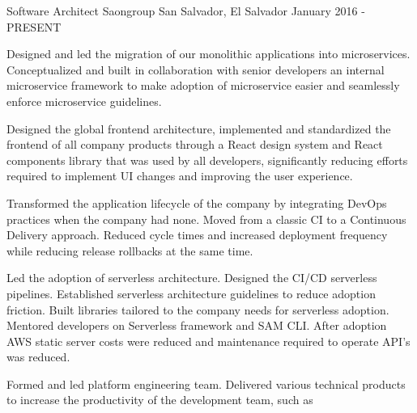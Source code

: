 

\begin{cventries}

  \cventry
    {Software Architect} %
    {Saongroup} %
    {San Salvador, El Salvador} %
    {January 2016 - PRESENT} %
    {
      \begin{cvitems} %
        \item {
          Designed and led the migration of our monolithic applications into microservices. Conceptualized and built in collaboration with senior developers an internal microservice framework to make adoption of microservice easier and seamlessly enforce microservice guidelines.
        }
        \item {
          Designed the global frontend architecture, implemented and standardized
          the frontend of all company products through a React design system and React
          components library that was used by all developers, significantly reducing efforts
          required to implement UI changes and improving the user experience.
        }
        \item {
          Transformed the application lifecycle of the company by integrating
          DevOps practices when the company had none. Moved from a classic CI to
          a Continuous Delivery approach. Reduced cycle times and increased
          deployment frequency while reducing release rollbacks at the same time.
        }
        \item {
          Led the adoption of serverless architecture. Designed the CI/CD serverless pipelines. Established serverless architecture guidelines to reduce adoption friction. Built libraries tailored to the company needs for serverless adoption. Mentored developers on Serverless framework and SAM CLI. After adoption AWS static server costs were reduced and maintenance required to operate API's was reduced.
        }
        \item {
          Formed and led platform engineering team. Delivered various technical
          products to increase the productivity of the development team, such as
}
\end{cvitems}}
\end{cventries}
